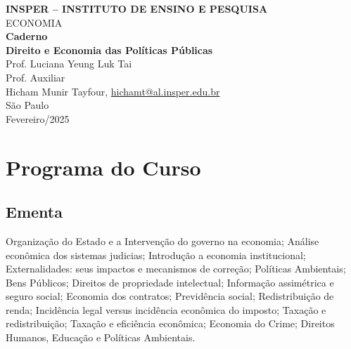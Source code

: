 \documentclass[a4paper,12pt]{article}[abntex2]
\begin{document}
\begin{titlepage}
    \centering
    \vspace*{1cm}
    \Large\textbf{INSPER – INSTITUTO DE ENSINO E PESQUISA}\\
    \Large ECONOMIA\\
    \vspace{1.5cm}
    \Large\textbf{Caderno}\\
    \textbf{Direito e Economia das Políticas Públicas}\\
    \vspace{1.5cm}
    Prof. Luciana Yeung Luk Tai\\
    Prof. Auxiliar  \\
    \vfill
    \normalsize
    Hicham Munir Tayfour, \href{mailto:hichamt@al.insper.edu.br}{hichamt@al.insper.edu.br}\\

    \vfill
    São Paulo\\
    Fevereiro/2025
\end{titlepage}

\newpage
\tableofcontents
\thispagestyle{empty} %

\newpage 
\listoffigures
\thispagestyle{empty} %

\newpage
\setcounter{page}{1} %
\justify
\onehalfspacing


\section*{\textbf{Programa do Curso}}
\subsection*{\textbf{Ementa}}
Organização do Estado e a Intervenção do governo na economia; Análise econômica dos sistemas judicias; Introdução a economia institucional; Externalidades: seus impactos e mecanismos de correção; Políticas Ambientais; Bens Públicos; Direitos de propriedade intelectual; Informação assimétrica e seguro social; Economia dos contratos; Previdência social; Redistribuição de renda; Incidência legal versus incidência econômica do imposto; Taxação e redistribuição; Taxação e eficiência econômica; Economia do Crime; Direitos Humanos, Educação e Políticas Ambientais.
\end{document}
